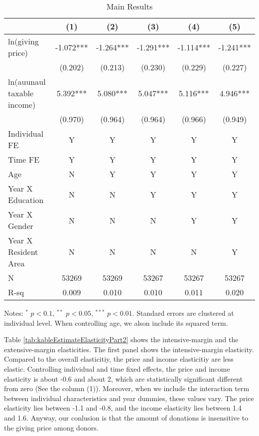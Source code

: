 \documentclass[ review  , 3p ]{elsarticle}
\begin{document}
  \begin{table}

  \caption{\label{tab:kableEstimateElasticityPart1}Main Results}
  \centering
  \fontsize{7}{9}\selectfont
  \begin{threeparttable}
  \begin{tabular}[t]{lccccc}
  \toprule
   & (1) & (2) & (3) & (4) & (5)\\
  \midrule
  ln(giving price) & -1.072*** & -1.264*** & -1.291*** & -1.114*** & -1.241***\\
   & (0.202) & (0.213) & (0.230) & (0.229) & (0.227)\\
  ln(auunaul taxable income) & 5.392*** & 5.080*** & 5.047*** & 5.116*** & 4.946***\\
   & (0.970) & (0.964) & (0.964) & (0.966) & (0.949)\\
  Individual FE & Y & Y & Y & Y & Y\\
  Time FE & Y & Y & Y & Y & Y\\
  Age & N & Y & Y & Y & Y\\
  Year X Education & N & N & Y & Y & Y\\
  Year X Gender & N & N & N & Y & Y\\
  Year X Resident Area & N & N & N & N & Y\\
  N & 53269 & 53269 & 53267 & 53267 & 53267\\
  R-sq & 0.009 & 0.010 & 0.010 & 0.011 & 0.020\\
  \bottomrule
  \end{tabular}
  \begin{tablenotes}
  \item Notes: $^{*}$ $p < 0.1$, $^{**}$ $p < 0.05$, $^{***}$ $p < 0.01$. Standard errors are clustered at individual level. When controlling age, we alson include its squared term.
  \end{tablenotes}
  \end{threeparttable}
  \end{table}

  Table \ref{tab:kableEstimateElasticityPart2} shows the intensive-margin and the extensive-margin elasticities.
  The first panel shows the intensive-margin elasticity.
  Compared to the overall elasticitiy, the price and income elasticitiy are less elastic.
  Controlling individual and time fixed effects,
  the price and income elasticity is about -0.6 and about 2,
  which are statistically significant different from zero (See the column (1)).
  Moreover, when we include the interaction term between individual characteristics and year dummies,
  these values vary.
  The price elasticity lies between -1.1 and -0.8,
  and the income elasticity lies between 1.4 and 1.6.
  Anyway, our conlusion is that the amount of donations is insensitive to the giving price among donors.
\end{document}
